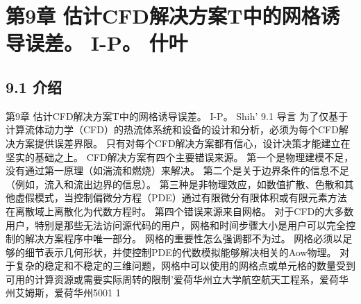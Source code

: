 \documentclass[UTF8,11pt,a4paper,openany,fontset=fandol]{ctexbook}
\begin{document}
\clearpage
\chapter{第9章 估计CFD解决方案T中的网格诱导误差。 I-P。 什叶}
\section{9.1 介绍}
第9章 估计CFD解决方案T中的网格诱导误差。 I-P。 Shih' 9.1 导言 为了仅基于计算流体动力学（CFD）的热流体系统和设备的设计和分析，必须为每个CFD解决方案提供误差界限。 只有对每个CFD解决方案都有信心，设计决策才能建立在坚实的基础之上。 CFD解决方案有四个主要错误来源。 第一个是物理建模不足，没有通过第一原理（如湍流和燃烧）来解决。 第二个是关于边界条件的信息不足（例如，流入和流出边界的信息）。 第三种是非物理效应，如数值扩散、色散和其他虚假模式，当控制偏微分方程（PDE）通过有限微分有限体积或有限元素方法在离散域上离散化为代数方程时。 第四个错误来源来自网格。 对于CFD的大多数用户，特别是那些无法访问源代码的用户，网格和时间步骤大小是用户可以完全控制的解决方案程序中唯一部分。 网格的重要性怎么强调都不为过。 网格必须以足够的细节表示几何形状，并使控制PDE的代数模拟能够解决相关的Aow物理。 对于复杂的稳定和不稳定的三维问题，网格中可以使用的网格点或单元格的数量受到可用的计算资源或需要实际周转的限制'爱荷华州立大学航空航天工程系，爱荷华州艾姆斯，爱荷华州5001 1
\end{document}
